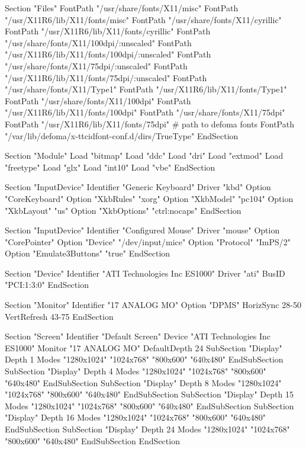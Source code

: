 \documentclass[mingoth,a4paper]{jsarticle}
\begin{document}
{{{{{{{{{{{{{{{{{{\begin{commandline}
Section "Files"
	FontPath	"/usr/share/fonts/X11/misc"
	FontPath	"/usr/X11R6/lib/X11/fonts/misc"
	FontPath	"/usr/share/fonts/X11/cyrillic"
	FontPath	"/usr/X11R6/lib/X11/fonts/cyrillic"
	FontPath	"/usr/share/fonts/X11/100dpi/:unscaled"
	FontPath	"/usr/X11R6/lib/X11/fonts/100dpi/:unscaled"
	FontPath	"/usr/share/fonts/X11/75dpi/:unscaled"
	FontPath	"/usr/X11R6/lib/X11/fonts/75dpi/:unscaled"
	FontPath	"/usr/share/fonts/X11/Type1"
	FontPath	"/usr/X11R6/lib/X11/fonts/Type1"
	FontPath	"/usr/share/fonts/X11/100dpi"
	FontPath	"/usr/X11R6/lib/X11/fonts/100dpi"
	FontPath	"/usr/share/fonts/X11/75dpi"
	FontPath	"/usr/X11R6/lib/X11/fonts/75dpi"
	# path to defoma fonts
	FontPath	"/var/lib/defoma/x-ttcidfont-conf.d/dirs/TrueType"
EndSection

Section "Module"
	Load	"bitmap"
	Load	"ddc"
	Load	"dri"
	Load	"extmod"
	Load	"freetype"
	Load	"glx"
	Load	"int10"
	Load	"vbe"
EndSection

Section "InputDevice"
	Identifier	"Generic Keyboard"
	Driver		"kbd"
	Option		"CoreKeyboard"
	Option		"XkbRules"	"xorg"
	Option		"XkbModel"	"pc104"
	Option		"XkbLayout"	"us"
	Option		"XkbOptions"	"ctrl:nocaps"
EndSection

Section "InputDevice"
	Identifier	"Configured Mouse"
	Driver		"mouse"
	Option		"CorePointer"
	Option		"Device"		"/dev/input/mice"
	Option		"Protocol"		"ImPS/2"
	Option		"Emulate3Buttons"	"true"
EndSection

Section "Device"
	Identifier	"ATI Technologies Inc ES1000"
	Driver		"ati"
	BusID		"PCI:1:3:0"
EndSection

Section "Monitor"
	Identifier	"17 ANALOG MO"
	Option		"DPMS"
	HorizSync	28-50
	VertRefresh	43-75
EndSection

\end{commandline}
\begin{commandline}
Section "Screen"
	Identifier	"Default Screen"
	Device		"ATI Technologies Inc ES1000"
	Monitor		"17 ANALOG MO"
	DefaultDepth	24
	SubSection "Display"
		Depth		1
		Modes		"1280x1024" "1024x768" "800x600" "640x480"
	EndSubSection
	SubSection "Display"
		Depth		4
		Modes		"1280x1024" "1024x768" "800x600" "640x480"
	EndSubSection
	SubSection "Display"
		Depth		8
		Modes		"1280x1024" "1024x768" "800x600" "640x480"
	EndSubSection
	SubSection "Display"
		Depth		15
		Modes		"1280x1024" "1024x768" "800x600" "640x480"
	EndSubSection
	SubSection "Display"
		Depth		16
		Modes		"1280x1024" "1024x768" "800x600" "640x480"
	EndSubSection
	SubSection "Display"
		Depth		24
		Modes		"1280x1024" "1024x768" "800x600" "640x480"
	EndSubSection
EndSection


\end{commandline}}}}}}}}}}}}}}}}}}}
\end{document}

